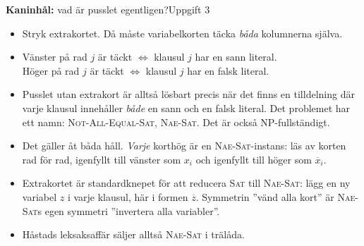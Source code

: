 \documentclass[aspectratio=169,10pt]{beamer}
\newcommand{\rabbit}{\textcolor{warnorange}{\textbf{Kaninhål:}} }
\newcommand{\prob}[1]{\textsc{#1}}
\newcommand{\xbar}[1]{\overline{x}_{#1}}
\begin{document}
\begin{frame}{\rabbit vad är pusslet egentligen?}{Uppgift 3}
  \begin{itemize}
    \item<1-> Stryk extrakortet. Då måste variabelkorten täcka \emph{båda} kolumnerna själva.
    \item<2-> Vänster på rad $j$ är täckt $\iff$ klausul $j$ har en sann literal.\\
      Höger på rad $j$ är täckt $\iff$ klausul $j$ har en falsk literal.
    \item<3-> Pusslet utan extrakort är alltså lösbart precis när det finns en tilldelning där varje klausul innehåller \emph{både} en sann och en falsk literal. Det problemet har ett namn: \prob{Not-All-Equal-Sat}, \prob{Nae-Sat}. Det är också NP-fullständigt.
    \item<4-> Det gäller åt båda håll. \emph{Varje} korthög är en \prob{Nae-Sat}-instans: läs av korten rad för rad, igenfyllt till vänster som $x_i$ och igenfyllt till höger som $\xbar{i}$.
    \item<5-> Extrakortet är standardknepet för att reducera \prob{Sat} till \prob{Nae-Sat}: lägg en ny variabel $z$ i varje klausul, här i formen $\overline{z}$. Symmetrin ''vänd alla kort'' är \prob{Nae-Sat}s egen symmetri ''invertera alla variabler''.
    \item<6-> Håstads leksaksaffär säljer alltså \prob{Nae-Sat} i trälåda.
  \end{itemize}
\end{frame}
\end{document}
